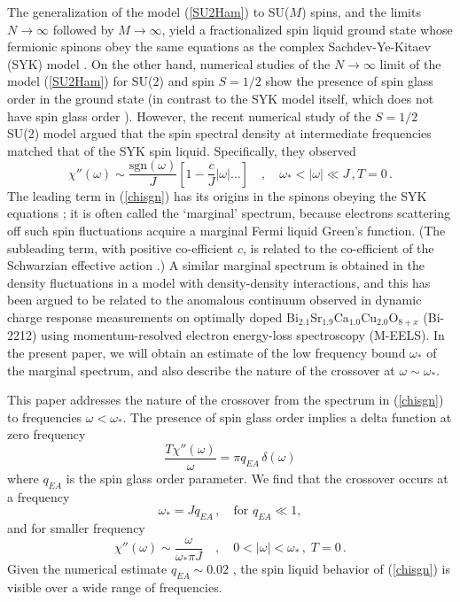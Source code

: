 \documentclass[aps,prx,preprint,onecolumn,citeautoscript,superscriptaddress,nofootinbib,
eqsecnum]{revtex4}
\newcommand{\beq}{\begin{equation}}
\newcommand{\eeq}{\end{equation}}
\begin{document}
The generalization of the model (\ref{SU2Ham}) to SU($M$) spins, and the limits $N \rightarrow \infty$ followed by $M \rightarrow \infty$, yield a fractionalized spin liquid ground state \cite{SY92} whose fermionic spinons obey the same equations as the complex Sachdev-Ye-Kitaev (SYK) model \cite{kitaev2015talk,Sachdev:2015efa,Gu2019,Tikhanovskaya:2020elb}. On the other hand, numerical studies \cite{GrempelRozenberg98,ArracheaRozenbergSG2002,Shackleton2021} of the $N \rightarrow \infty$ limit of the model (\ref{SU2Ham}) for SU(2) and spin $S=1/2$ show the presence of spin glass order in the ground state (in contrast to the SYK model itself, which does not have spin glass order \cite{Gur-Ari:2018okm}). However, the recent numerical study of the $S=1/2$ SU(2) model argued \cite{Shackleton2021} that the spin spectral density at intermediate frequencies matched that of the SYK spin liquid. Specifically, they observed 
\beq
\chi'' (\omega) \sim  \frac{\mbox{sgn}(\omega)}{J} \left[ 1 - \frac{c}{J} |\omega| \ldots \right] \quad , \quad \omega_\ast < |\omega| \ll J\,, T=0\,. \label{chisgn}
\eeq
The leading term in (\ref{chisgn}) has its origins in the spinons obeying the SYK equations \cite{SY92}; it is often called the `marginal' spectrum, because electrons scattering off such spin fluctuations acquire a marginal Fermi liquid Green's function. (The subleading term, with positive co-efficient $c$, is related to the co-efficient of the Schwarzian effective action \cite{Tikhanovskaya:2020elb}.) A similar marginal spectrum is obtained in the density fluctuations in a model with density-density interactions, and this has been argued \cite{Joshi20} to be related to the anomalous continuum observed in dynamic charge response measurements \cite{Abbamonte1,Abbamonte2}
on optimally doped Bi$_{2.1}$Sr$_{1.9}$Ca$_{1.0}$Cu$_{2.0}$O$_{8+x}$ (Bi-2212) using momentum-resolved electron energy-loss spectroscopy (M-EELS). 
In the present paper, we will obtain an estimate of the low frequency bound $\omega_\ast$ of the marginal spectrum, and also describe the nature of the crossover at $\omega \sim \omega_\ast$. 




This paper addresses the nature of the crossover from the spectrum in (\ref{chisgn}) to frequencies $\omega < \omega_\ast$. The presence of spin glass order implies a delta function at zero frequency
\beq
\frac{T \chi'' (\omega)}{\omega} =  \pi q_{EA} \, \delta(\omega) \label{chidelta}
\eeq
where $q_{EA}$ is the spin glass order parameter. We find that the crossover occurs at a frequency
\beq
\omega_\ast = J q_{EA}\,, \quad \mbox{for $q_{EA} \ll 1$}, \label{omegastar}
\eeq
and for smaller frequency
\beq
\chi'' (\omega) \sim  \frac{\omega}{\omega_\ast \pi J}\quad , \quad 0< |\omega| < \omega_\ast\,, \; T=0\,. \label{chilinear}
\eeq
Given the numerical estimate $q_{EA} \sim 0.02$ \cite{Shackleton2021}, the spin liquid behavior of (\ref{chisgn}) is visible over a wide range of frequencies. 
\end{document}
